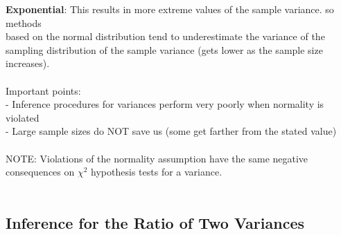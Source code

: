 \documentclass[12pt, a4paper]{article}
\begin{document}
	\textbf{Exponential}: This results in more extreme values of the sample variance. so methods \\ \hspace*{27mm} based on the normal distribution tend to underestimate the variance of the \hspace*{27mm} sampling distribution of the sample variance (gets lower as the sample size \hspace*{27mm} increases). \\~\\
	Important points: \\
	- Inference procedures for variances perform very poorly when normality is violated \\
	- Large sample sizes do NOT save us (some get farther from the stated value) \\~\\
	NOTE: Violations of the normality assumption have the same negative consequences on $\chi^2$ hypothesis tests for a variance. \\~\\
	
	\subsection{Inference for the Ratio of Two Variances}
\end{document}

